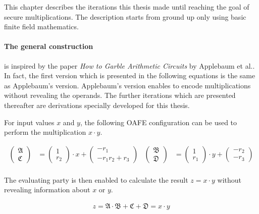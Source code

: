 \label{sec:toward-sec-muls}

This chapter describes the iterations this thesis made until reaching the goal
of secure multiplications. The description starts from ground up only using
basic finite field mathematics.


\paragraph{The general construction} is inspired by the paper \emph{How to
Garble Arithmetic Circuits} by Applebaum et al.\cite{gac2012}. In fact, the
first version which is presented in the following equations is the same as
Applebaum's version. Applebaum's version enables to encode multiplications
without revealing the operands. The further iterations which are presented
thereafter are derivations specially developed for this thesis.

For input values $x$ and $y$, the following OAFE configuration can be used to
perform the multiplication $x \cdot y$.

\begin{align*}
\begin{pmatrix}\mathfrak{A}\\\mathfrak{C}\end{pmatrix} & =
\begin{pmatrix}1\\r_2\end{pmatrix} \cdot x +
\begin{pmatrix}-r_1\\-r_1r_2+r_3\end{pmatrix} &
\begin{pmatrix}\mathfrak{B}\\\mathfrak{D}\end{pmatrix} & =
\begin{pmatrix}1\\r_1\end{pmatrix} \cdot y +
\begin{pmatrix}-r_2\\-r_3\end{pmatrix}\\
\end{align*}

\noindent{}The evaluating party is then enabled to calculate the result $z = x
\cdot y$ without revealing information about $x$ or $y$.


\begin{align*}
  z = \mathfrak{A} \cdot \mathfrak{B} + \mathfrak{C} + \mathfrak{D} =
  x \cdot y\\
\end{align*}

